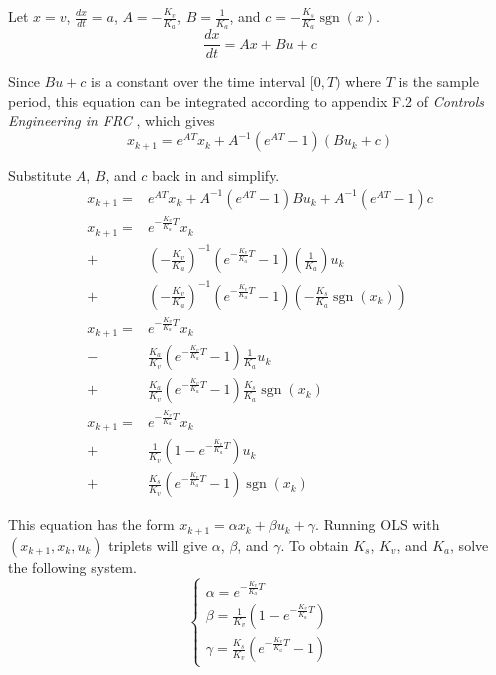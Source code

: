 \documentclass[10pt,conference,compsoc]{IEEEtran}
\DeclareMathOperator{\sgn}{sgn}
\begin{document}
Let $x = v$, $\frac{dx}{dt} = a$, $A = -\frac{K_v}{K_a}$, $B = \frac{1}{K_a}$,
and $c = -\frac{K_s}{K_a}\sgn(x)$.
\begin{equation*}
  \frac{dx}{dt} = Ax + Bu + c
\end{equation*}

Since $Bu + c$ is a constant over the time interval $[0, T)$ where $T$ is the
sample period, this equation can be integrated according to appendix F.2 of
\textit{Controls Engineering in FRC} \cite{bib:controls-in-frc}, which gives
\begin{equation*}
  x_{k+1} = e^{AT} x_k + A^{-1} (e^{AT} - 1) (Bu_k + c)
\end{equation*}

Substitute $A$, $B$, and $c$ back in and simplify.
\begin{equation*}
  \begin{aligned}
    x_{k+1} =& e^{AT} x_k + A^{-1} (e^{AT} - 1)Bu_k + A^{-1} (e^{AT} - 1)c \\
    x_{k+1} =& e^{-\frac{K_v}{K_a} T} x_k \\
      +& \left(-\frac{K_v}{K_a}\right)^{-1}
        \left(e^{-\frac{K_v}{K_a} T} - 1\right)
        \left(\frac{1}{K_a}\right) u_k \\
      +& \left(-\frac{K_v}{K_a}\right)^{-1}
        \left(e^{-\frac{K_v}{K_a} T} - 1\right)
        \left(-\frac{K_s}{K_a}\sgn(x_k)\right) \\
    x_{k+1} =& e^{-\frac{K_v}{K_a} T} x_k \\
      -& \frac{K_a}{K_v}
        \left(e^{-\frac{K_v}{K_a} T} - 1\right)
        \frac{1}{K_a} u_k \\
      +& \frac{K_a}{K_v}
        \left(e^{-\frac{K_v}{K_a} T} - 1\right)
        \frac{K_s}{K_a}\sgn(x_k) \\
    x_{k+1} =& e^{-\frac{K_v}{K_a} T} x_k \\
      +& \frac{1}{K_v}
        \left(1 - e^{-\frac{K_v}{K_a} T}\right) u_k \\
      +& \frac{K_s}{K_v}
        \left(e^{-\frac{K_v}{K_a} T} - 1\right)\sgn(x_k)
  \end{aligned}
\end{equation*}

This equation has the form $x_{k+1} = \alpha x_k + \beta u_k + \gamma$. Running
OLS with $(x_{k+1}, x_k, u_k)$ triplets will give $\alpha$, $\beta$, and
$\gamma$. To obtain $K_s$, $K_v$, and $K_a$, solve the following system.
\begin{equation*}
  \begin{cases}
    \alpha = e^{-\frac{K_v}{K_a} T} \\
    \beta = \frac{1}{K_v}\left(1 - e^{-\frac{K_v}{K_a} T}\right) \\
    \gamma = \frac{K_s}{K_v}\left(e^{-\frac{K_v}{K_a} T} - 1\right)
  \end{cases}
\end{equation*}
\end{document}
